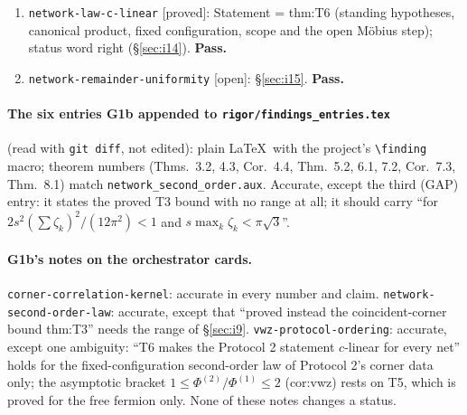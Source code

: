 \documentclass[11pt]{article}
\begin{document}
\begin{enumerate}[leftmargin=1.5em,label=(\roman*)]
 compact $\mathcal Z$ and $\eps$ there is $s_\eps$ \dots\ ALL positions''), open parts stated.  Its edge to
 \texttt{network-global-bound-coincident} uses T3 $\langle1\rangle3$--$\langle1\rangle6$ at small $s$ only, which the range
 gap does not touch.  MINOR notes of \S\ref{sec:i12}.  \textbf{Pass.}
\item \texttt{network-law-c-linear} [proved]: Statement = thm:T6 (standing hypotheses, canonical product, fixed
 configuration, scope and the open Möbius step); status word right (\S\ref{sec:i14}).  \textbf{Pass.}
\item \texttt{network-remainder-uniformity} [open]: \S\ref{sec:i15}.  \textbf{Pass.}
\end{enumerate}
\paragraph{The six entries G1b appended to \texttt{rigor/findings\_entries.tex}} (read with \texttt{git diff}, not
edited): plain \LaTeX\ with the project's \verb|\finding| macro; theorem numbers (Thms.~3.2, 4.3, Cor.~4.4, Thm.~5.2,
6.1, 7.2, Cor.~7.3, Thm.~8.1) match \texttt{network\_second\_order.aux}.  Accurate, except the third (GAP) entry: it
states the proved T3 bound with no range at all; it should carry ``for $2s^2(\sum\zeta_k)^2/(12\pi^2)<1$ and
$s\max_k\zeta_k<\pi\sqrt3$''.
\paragraph{G1b's notes on the orchestrator cards.}  \texttt{corner-correlation-kernel}: accurate in every number and
claim.  \texttt{network-second-order-law}: accurate, except that ``proved instead the coincident-corner bound thm:T3''
needs the range of \S\ref{sec:i9}.  \texttt{vwz-protocol-ordering}: accurate, except one ambiguity: ``T6 makes the
Protocol 2 statement $c$-linear for every net'' holds for the fixed-configuration second-order law of Protocol 2's corner
data only; the asymptotic bracket $1\le\Phi^{(2)}/\Phi^{(1)}\le2$ (cor:vwz) rests on T5, which is proved for the free
fermion only.  None of these notes changes a status.
\end{document}
